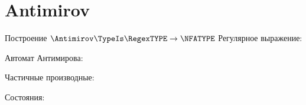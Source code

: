 \section{Antimirov}
\begin{frame}{Построение $\Antimirov\TypeIs\RegexTYPE\to\NFATYPE$}
	Регулярное выражение:

	Автомат Антимирова:


	Частичные производные:


	Состояния:


\end{frame}


